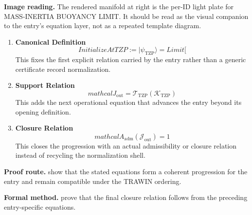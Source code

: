 \begin{samepage}
\noindent\begin{minipage}[t]{0.45\linewidth}
\vspace{0pt}
\raggedright
\scriptsize\textbf{Image reading.} The rendered manifold at right is the per-ID light plate for MASS-INERTIA BUOYANCY LIMIT. It should be read as the visual companion to the entry's equation layer, not as a repeated template diagram.\par
\end{minipage}\hfill
\begin{minipage}[t]{0.53\linewidth}
\vspace*{-0.10in}
\raggedright
{}
\end{minipage}
\end{samepage}

\clearpage


\begin{enumerate}[leftmargin=1.6em,itemsep=9pt,topsep=6pt]
\item \textbf{Canonical Definition}
\[
InitializeAtTZP := \lvert \psi_{\mathrm{TZP}} \rangle = Limit[
\]
This fixes the first explicit relation carried by the entry rather than a generic certificate record normalization.

\item \textbf{Support Relation}
\[
mathcal{J}_{\mathrm{out}} = \mathcal{T}_{\mathrm{TZP}}\!\left(\mathcal{K}_{\mathrm{TZP}}\right)
\]
This adds the next operational equation that advances the entry beyond its opening definition.

\item \textbf{Closure Relation}
\[
mathcal{A}_{\mathrm{adm}}\!\left(\mathcal{J}_{\mathrm{out}}\right)=1
\]
This closes the progression with an actual admissibility or closure relation instead of recycling the normalization shell.
\end{enumerate}

\textbf{Proof route.} show that the stated equations form a coherent progression for the entry and remain compatible under the TRAWIN ordering.

\textbf{Formal method.} prove that the final closure relation follows from the preceding entry-specific equations.

\medskip
{}

